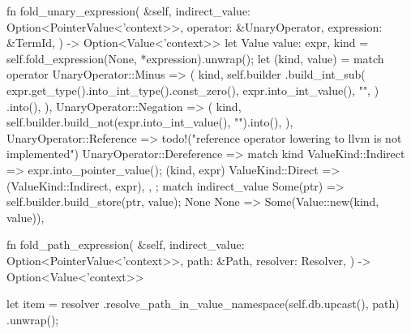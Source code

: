 \documentclass[
  oneside,
  english,
  coorientadorbanca,
  noabntexcite
]{ufsc-thesis-rn46-2019}
\begin{document}
\begin{rustcode}
{    fn fold_unary_expression(
        &self,
        indirect_value: Option<PointerValue<'context>>,
        operator: &UnaryOperator,
        expression: &TermId,
    ) -> Option<Value<'context>> {
        let Value { value: expr, kind } = self.fold_expression(None, *expression).unwrap();
        let (kind, value) = match operator {
            UnaryOperator::Minus => (
                kind,
                self.builder
                    .build_int_sub(
                        expr.get_type().into_int_type().const_zero(),
                        expr.into_int_value(),
                        "",
                    )
                    .into(),
            ),
            UnaryOperator::Negation => (
                kind,
                self.builder.build_not(expr.into_int_value(), "").into(),
            ),
            UnaryOperator::Reference => {
                todo!("reference operator lowering to llvm is not implemented")
            }
            UnaryOperator::Dereference => match kind {
                ValueKind::Indirect => {
                    expr.into_pointer_value();
                    (kind, expr)
                }
                ValueKind::Direct => (ValueKind::Indirect, expr),
            },
        };
        match indirect_value {
            Some(ptr) => {
                self.builder.build_store(ptr, value);
                None
            }
            None => Some(Value::new(kind, value)),
        }
    }

    fn fold_path_expression(
        &self,
        indirect_value: Option<PointerValue<'context>>,
        path: &Path,
        resolver: Resolver,
    ) -> Option<Value<'context>> {
        let item = resolver
            .resolve_path_in_value_namespace(self.db.upcast(), path)
            .unwrap();

}}
\end{rustcode}
\end{document}
